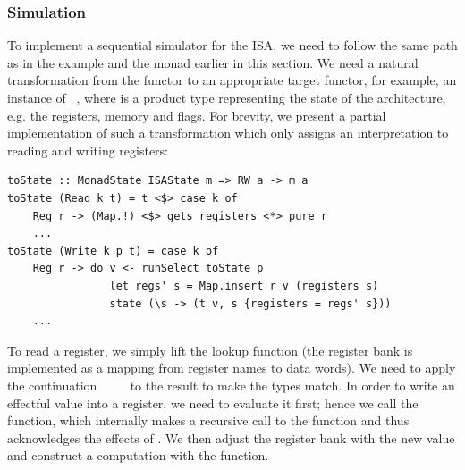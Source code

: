 
\subsubsection{Simulation}

To implement a sequential simulator for the ISA, we need to follow the same path
as in the  example and the  monad earlier in this section.
We need a natural transformation from the functor  to an appropriate
target functor, for example, an instance of ~,
where  is a product type representing the state of the
architecture, e.g. the registers, memory and flags. For brevity, we present a
partial implementation of such a transformation which only assigns an
interpretation to reading and writing registers:

\vspace{1mm}
\begin{verbatim}
toState :: MonadState ISAState m => RW a -> m a
toState (Read k t) = t <$> case k of
    Reg r -> (Map.!) <$> gets registers <*> pure r
    ...
toState (Write k p t) = case k of
    Reg r -> do v <- runSelect toState p
                let regs' s = Map.insert r v (registers s)
                state (\s -> (t v, s {registers = regs' s}))
    ...
\end{verbatim}
\vspace{1mm}

To read a register, we simply lift the  lookup function (the
register bank is implemented as a mapping from register names to data words). We need to
apply the continuation ~\hs{::}~~\hs{->}~ to the result
to make the types match. In order to write an effectful value  into a
register, we need to evaluate it first; hence we call the 
function, which internally makes a recursive call to the  function
and thus acknowledges the effects of . We then adjust the register bank
with the new value and construct a  computation with the
 function.

